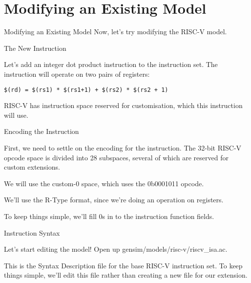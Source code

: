 \section{Modifying an Existing Model}

\begin{frame}{Modifying an Existing Model}
Now, let's try modifying the RISC-V model.
\end{frame}

\begin{frame}[fragile]{The New Instruction}

Let's add an integer dot product instruction to the instruction set. 
The instruction will operate on two pairs of registers:

\begin{lstlisting}
$(rd) = $(rs1) * $(rs1+1) + $(rs2) * $(rs2 + 1)
\end{lstlisting}

RISC-V has instruction space reserved for customisation, which this 
instruction will use.

\end{frame}

\begin{frame}{Encoding the Instruction}






First, we need to settle on the encoding for the instruction. The 32-bit
RISC-V opcode space is divided into 28 subspaces, several of
which are reserved for custom extensions. 

\bigskip

We will use the custom-0 space, which uses the 0b0001011 opcode.

\smallskip

We'll use the R-Type format, since we're doing an operation on registers.

\smallskip

To keep things simple, we'll fill 0s in to the instruction function
fields.

\end{frame}

\begin{frame}{Instruction Syntax}

Let's start editing the model! Open up {\ttfamily gensim/models/risc-v/riscv\_isa.ac}.

This is the Syntax Description file for the base RISC-V instruction set.
To keep things simple, we'll edit this file rather than creating a new 
file for our extension. 

\end{frame}

